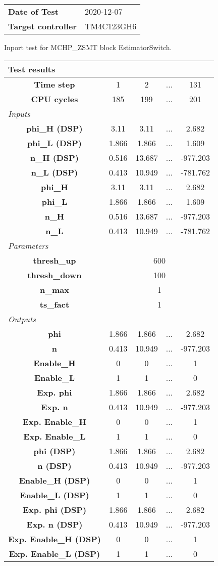 \begin{tabular}{l l}
\textbf{Date of Test} & 2020-12-07 \tabularnewline
\textbf{Target controller} & TM4C123GH6 \tabularnewline
\end{tabular}
\vspace{1ex}
Inport test for MCHP_ZSMT block EstimatorSwitch.

\vspace{1em}
\begin{tabularx}{\textwidth}{|c|c|c|>{\centering\arraybackslash}X|c|}
\hline
\multicolumn{5}{|l|}{\cellcolor[gray]{0.8}\textbf{Test results}} \tabularnewline \hline
\textbf{Time step} & 1 & 2 & ... & 131 \tabularnewline \hline
\textbf{CPU cycles} & 185 & 199 & ... & 201 \tabularnewline \hline
\multicolumn{5}{|l|}{\cellcolor[gray]{0.9}\textit{Inputs}} \tabularnewline \hline
\textbf{phi\_H (DSP)} & 3.11 & 3.11 & ... & 2.682 \tabularnewline \hline
\textbf{phi\_L (DSP)} & 1.866 & 1.866 & ... & 1.609 \tabularnewline \hline
\textbf{n\_H (DSP)} & 0.516 & 13.687 & ... & -977.203 \tabularnewline \hline
\textbf{n\_L (DSP)} & 0.413 & 10.949 & ... & -781.762 \tabularnewline \hline
\textbf{phi\_H} & 3.11 & 3.11 & ... & 2.682 \tabularnewline \hline
\textbf{phi\_L} & 1.866 & 1.866 & ... & 1.609 \tabularnewline \hline
\textbf{n\_H} & 0.516 & 13.687 & ... & -977.203 \tabularnewline \hline
\textbf{n\_L} & 0.413 & 10.949 & ... & -781.762 \tabularnewline \hline
\multicolumn{5}{|l|}{\cellcolor[gray]{0.9}\textit{Parameters}} \tabularnewline \hline
\textbf{thresh\_up} & \multicolumn{4}{c|}{600} \tabularnewline \hline
\textbf{thresh\_down} & \multicolumn{4}{c|}{100} \tabularnewline \hline
\textbf{n\_max} & \multicolumn{4}{c|}{1} \tabularnewline \hline
\textbf{ts\_fact} & \multicolumn{4}{c|}{1} \tabularnewline \hline
\multicolumn{5}{|l|}{\cellcolor[gray]{0.9}\textit{Outputs}} \tabularnewline \hline
\textbf{phi} & 1.866 & 1.866 & ... & 2.682 \tabularnewline \hline
\textbf{n} & 0.413 & 10.949 & ... & -977.203 \tabularnewline \hline
\textbf{Enable\_H} & 0 & 0 & ... & 1 \tabularnewline \hline
\textbf{Enable\_L} & 1 & 1 & ... & 0 \tabularnewline \hline
\textbf{Exp. phi} & 1.866 & 1.866 & ... & 2.682 \tabularnewline \hline
\textbf{Exp. n} & 0.413 & 10.949 & ... & -977.203 \tabularnewline \hline
\textbf{Exp. Enable\_H} & 0 & 0 & ... & 1 \tabularnewline \hline
\textbf{Exp. Enable\_L} & 1 & 1 & ... & 0 \tabularnewline \hline
\textbf{phi (DSP)} & 1.866 & 1.866 & ... & 2.682 \tabularnewline \hline
\textbf{n (DSP)} & 0.413 & 10.949 & ... & -977.203 \tabularnewline \hline
\textbf{Enable\_H (DSP)} & 0 & 0 & ... & 1 \tabularnewline \hline
\textbf{Enable\_L (DSP)} & 1 & 1 & ... & 0 \tabularnewline \hline
\textbf{Exp. phi (DSP)} & 1.866 & 1.866 & ... & 2.682 \tabularnewline \hline
\textbf{Exp. n (DSP)} & 0.413 & 10.949 & ... & -977.203 \tabularnewline \hline
\textbf{Exp. Enable\_H (DSP)} & 0 & 0 & ... & 1 \tabularnewline \hline
\textbf{Exp. Enable\_L (DSP)} & 1 & 1 & ... & 0 \tabularnewline \hline
\end{tabularx}
\vspace{1ex}

